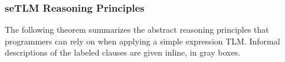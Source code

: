 \documentclass[acmsmall,review,anonymous]{acmart}\settopmatter{printfolios=true,printccs=false,printacmref=false}
\begin{document}


\subsubsection{seTLM Reasoning Principles} 

The following theorem summarizes the abstract reasoning principles that programmers can rely on when applying a simple expression TLM. Informal descriptions of the labeled clauses are given inline, in gray boxes. 
\end{document}
